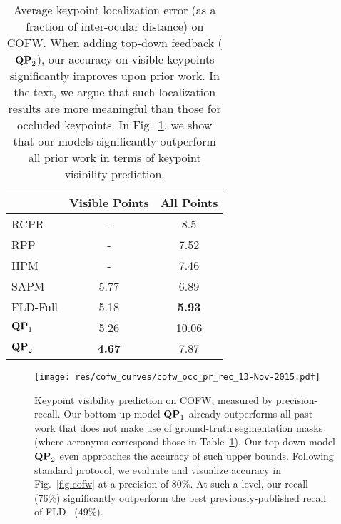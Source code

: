 \documentclass[10pt,twocolumn,letterpaper]{article}
\newcommand{\QP}[1]{{${\bf QP}_{#1}$}}
\begin{document}
\begin{table}
  \begin{center}
    \begin{tabular}{l|c|c}
                                    & Visible Points & All Points \\
      \hline \hline
      RCPR\cite{burgos2013robust}   & -              & 8.5        \\
      RPP\cite{yang2015robust}      & -              & 7.52       \\
      HPM\cite{ghiasi2014occlusion} & -              & 7.46       \\
      SAPM\cite{ghiasi2015sapm}     & 5.77           & 6.89       \\
      FLD-Full\cite{wu2015fld}      & 5.18           & {\bf 5.93} \\
      \hline
\QP{1}                        & 5.26           & 10.06      \\
      \QP{2}                        & {\bf 4.67}     & 7.87       \\
    \end{tabular}
  \end{center}
\caption{Average keypoint localization error (as a fraction of
    inter-ocular distance) on COFW. When adding top-down feedback
    (\QP{2}), our accuracy on visible keypoints significantly improves
    upon prior work. In the text, we argue that such localization
    results are more meaningful than those for occluded keypoints. In
    Fig.~\ref{fig:cofw-curves}, we show that our models significantly
    outperform all prior work in terms of keypoint visibility
    prediction. }
\label{table:cofw}
\end{table}


\begin{figure}[t]
  \centering
\texttt{[image: res/cofw\_curves/cofw\_occ\_pr\_rec\_13-Nov-2015.pdf]}
\caption{Keypoint visibility prediction on COFW, measured by
    precision-recall. Our bottom-up model \QP{1} already
    outperforms all past work that does not make use of ground-truth
    segmentation masks (where acronyms correspond those in
    Table~\ref{table:cofw}). Our top-down model \QP{2} even
    approaches the accuracy of such upper bounds. Following standard protocol,
    we evaluate and visualize accuracy in Fig.~\ref{fig:cofw} at a
    precision of 80\%. At such a level, our recall (76\%) significantly outperform the best
    previously-published recall of FLD~\cite{wu2015fld} (49\%).}
  \label{fig:cofw-curves}
\end{figure}
\end{document}
